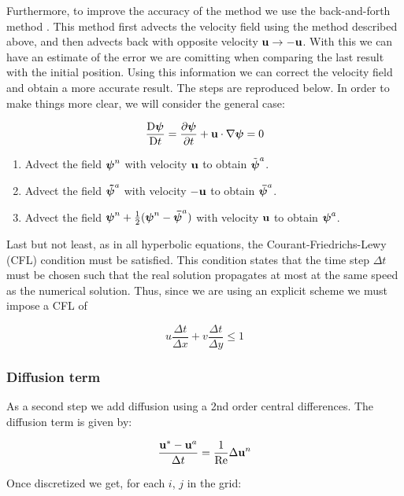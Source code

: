 Furthermore, to improve the accuracy of the method we use the back-and-forth method \cite{backforth}. This method first advects the velocity field using the method described above, and then advects back with opposite velocity $\boldsymbol{\mathrm{u}}\to -\boldsymbol{\mathrm{u}}$. With this we can have an estimate of the error we are comitting when comparing the last result with the initial position. Using this information we can correct the velocity field and obtain a more accurate result. The steps are reproduced below. In order to make things more clear, we will consider the general case:

\begin{equation*}
  \frac{\mathrm{D}\boldsymbol{\mathrm{\psi}}}{\mathrm{D}t} = \pdv{\boldsymbol{\mathrm{\psi}}}{t} + \boldsymbol{\mathrm{u}} \cdot \nabla \boldsymbol{\mathrm{\psi}} = 0
\end{equation*}

\begin{enumerate}
  \item Advect the field $\boldsymbol{\mathrm{\psi}}^n$ with velocity $\boldsymbol{\mathrm{u}}$ to obtain $\tilde{\boldsymbol{\mathrm{\psi}}}^a$.
  \item Advect the field $\boldsymbol{\mathrm{\tilde{\psi}}}^a$ with velocity $-\boldsymbol{\mathrm{u}}$ to obtain $\boldsymbol{\mathrm{\bar{\psi}}}^a$.
  \item Advect the field $\boldsymbol{\mathrm{\psi}}^n + \frac{1}{2} (\boldsymbol{\mathrm{{\psi}}}^n - \boldsymbol{\mathrm{\bar{\psi}}}^a)$ with velocity $\boldsymbol{\mathrm{u}}$ to obtain $\boldsymbol{\mathrm{\psi}}^a$.
\end{enumerate}

Last but not least, as in all hyperbolic equations, the Courant-Friedrichs-Lewy (CFL) condition must be satisfied. This condition states that the time step $\Delta t$ must be chosen such that the real solution propagates at most at the same speed as the numerical solution. Thus, since we are using an explicit scheme we must impose a CFL of

$$u \frac{\Delta t}{\Delta x} +v \frac{\Delta t}{\Delta y}\leq 1$$

\subsubsection*{Diffusion term}
As a second step we add diffusion using a 2nd order central differences. The diffusion term is given by:

\begin{equation*}
  \frac{\boldsymbol{\mathrm{u}}^* - \boldsymbol{\mathrm{u}}^a}{\Delta t} = \frac{1}{\mathrm{Re}} \Delta \boldsymbol{\mathrm{u}}^n
\end{equation*}

Once discretized we get, for each $i$, $j$ in the grid:

